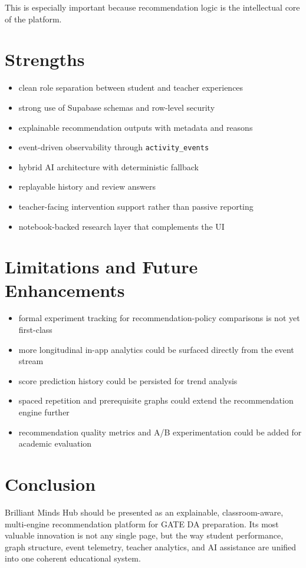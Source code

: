 \documentclass[10pt,twocolumn,a4paper]{article}
\newcommand{\tech}[1]{\texttt{#1}}
\newcommand{\project}{Brilliant Minds Hub}
\begin{document}
This is especially important because recommendation logic is the intellectual core of the platform.

\section{Strengths}
\begin{itemize}
  \item clean role separation between student and teacher experiences
  \item strong use of Supabase schemas and row-level security
  \item explainable recommendation outputs with metadata and reasons
  \item event-driven observability through \tech{activity\_events}
  \item hybrid AI architecture with deterministic fallback
  \item replayable history and review answers
  \item teacher-facing intervention support rather than passive reporting
  \item notebook-backed research layer that complements the UI
\end{itemize}

\section{Limitations and Future Enhancements}
\begin{itemize}
  \item formal experiment tracking for recommendation-policy comparisons is not yet first-class
  \item more longitudinal in-app analytics could be surfaced directly from the event stream
  \item score prediction history could be persisted for trend analysis
  \item spaced repetition and prerequisite graphs could extend the recommendation engine further
  \item recommendation quality metrics and A/B experimentation could be added for academic evaluation
\end{itemize}

\section{Conclusion}
\project{} should be presented as an explainable, classroom-aware, multi-engine recommendation platform for GATE DA preparation. Its most valuable innovation is not any single page, but the way student performance, graph structure, event telemetry, teacher analytics, and AI assistance are unified into one coherent educational system.
\end{document}
